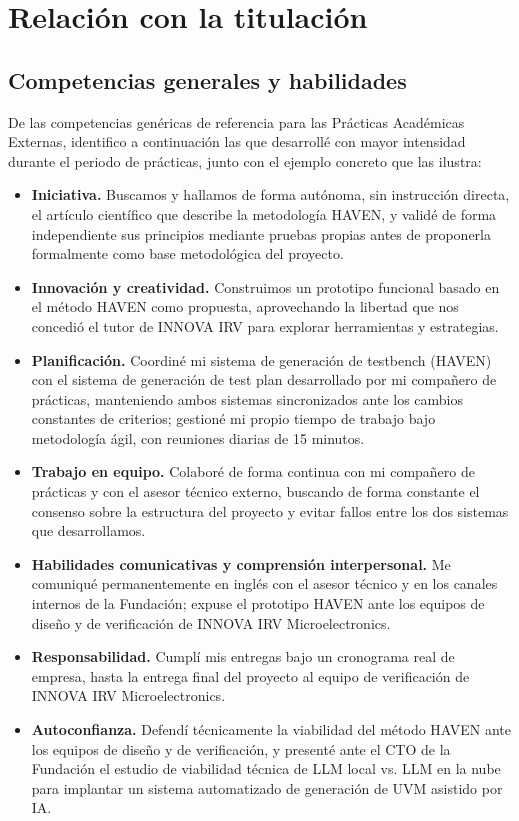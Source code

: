 \chapter{Relación con la titulación}

\section{Competencias generales y habilidades}

De las competencias genéricas de referencia para las Prácticas Académicas Externas, identifico a continuación las que desarrollé con mayor intensidad durante el periodo de prácticas, junto con el ejemplo concreto que las ilustra:

\begin{itemize}
  \item \textbf{Iniciativa.} Buscamos y hallamos de forma autónoma, sin instrucción directa, el artículo científico que describe la metodología HAVEN, y validé de forma independiente sus principios mediante pruebas propias antes de proponerla formalmente como base metodológica del proyecto.
  \item \textbf{Innovación y creatividad.} Construimos un prototipo funcional basado en el método HAVEN como propuesta, aprovechando la libertad que nos concedió el tutor de INNOVA IRV para explorar herramientas y estrategias.
  \item \textbf{Planificación.} Coordiné mi sistema de generación de testbench (HAVEN) con el sistema de generación de test plan desarrollado por mi compañero de prácticas, manteniendo ambos sistemas sincronizados ante los cambios constantes de criterios; gestioné mi propio tiempo de trabajo bajo metodología ágil, con reuniones diarias de 15 minutos.
  \item \textbf{Trabajo en equipo.} Colaboré de forma continua con mi compañero de prácticas y con el asesor técnico externo, buscando de forma constante el consenso sobre la estructura del proyecto y evitar fallos entre los dos sistemas que desarrollamos.
  \item \textbf{Habilidades comunicativas y comprensión interpersonal.} Me comuniqué permanentemente en inglés con el asesor técnico y en los canales internos de la Fundación; expuse el prototipo HAVEN ante los equipos de diseño y de verificación de INNOVA IRV Microelectronics.
  \item \textbf{Responsabilidad.} Cumplí mis entregas bajo un cronograma real de empresa, hasta la entrega final del proyecto al equipo de verificación de INNOVA IRV Microelectronics.
  \item \textbf{Autoconfianza.} Defendí técnicamente la viabilidad del método HAVEN ante los equipos de diseño y de verificación, y presenté ante el CTO de la Fundación el estudio de viabilidad técnica de LLM local vs. LLM en la nube para implantar un sistema automatizado de generación de UVM asistido por IA.
\end{itemize}

